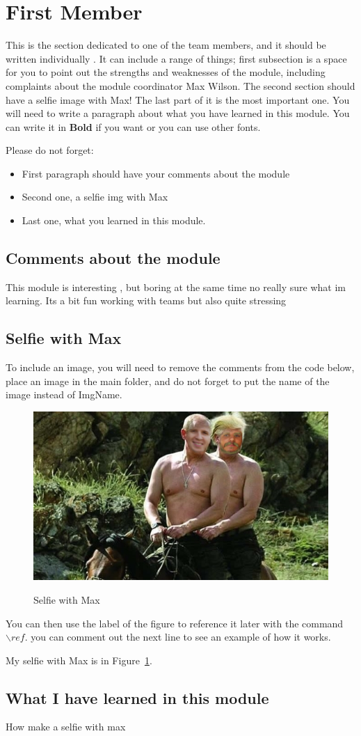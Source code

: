 \section{First Member}
This is the section dedicated to one of the team members, and it should be written individually . It can include a range of things; first subsection is a space for you to point out the strengths and weaknesses of the module, including complaints about the module coordinator Max Wilson. The second section should have a selfie image with Max! The last part of it is the most important one. You will need to write a paragraph about what you have learned in this module. You can write it in \textbf{Bold} if you want or you can use other fonts.

Please do not forget:
\begin{itemize}
	\item First paragraph should have your comments about the module
	\item Second one, a selfie img with Max
	\item Last one, what you learned in this module.
\end{itemize}

\subsection{Comments about the module}

This module is interesting , but boring at the same time  no really sure what im learning. Its a bit fun working with teams but also quite stressing

\subsection{Selfie with Max}

To include an image, you will need to remove the comments from the code below, place an image in the main folder, and do not forget to put the name of the image instead of ImgName.

\begin{figure}[h]
\caption{Selfie with Max}
\centering
\includegraphics[width=0.5\linewidth]{../images/maxvas.jpeg}
\label{fig:maxvas}
\end{figure}

You can then use the label of the figure to reference it later with the command ${\backslash}ref$. you can comment out the next line to see an example of how it works.

My selfie with Max is in  Figure~\ref{fig:maxvas}.

\subsection{What I have learned in this module}
How make a selfie with max
